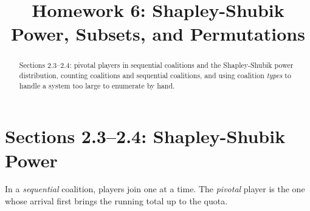 \documentclass[12pt]{ximera}
\title{Homework 6: Shapley-Shubik Power, Subsets, and Permutations}
\begin{document}
\begin{abstract}
Sections 2.3--2.4: pivotal players in sequential coalitions and the Shapley-Shubik
power distribution, counting coalitions and sequential coalitions, and using coalition
\emph{types} to handle a system too large to enumerate by hand.
\end{abstract}
\maketitle

\section*{Sections 2.3--2.4: Shapley-Shubik Power}

In a \emph{sequential} coalition, players join one at a time. The \emph{pivotal}
player is the one whose arrival first brings the running total up to the quota.
\end{document}
